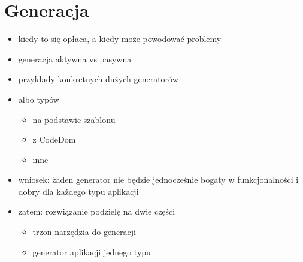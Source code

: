 \chapter{Generacja} \label{chap:generation}

\begin{itemize}
 \item kiedy to się opłaca, a kiedy może powodować problemy
 \item generacja aktywna vs pasywna
 \item przykłady konkretnych dużych generatorów
 \item albo typów
  \begin{itemize}
   \item na podstawie szablonu
   \item z CodeDom
   \item inne
  \end{itemize}
 \item wniosek: żaden generator nie będzie jednocześnie bogaty w funkcjonalności i dobry dla każdego typu aplikacji
 \item zatem: rozwiązanie podzielę na dwie części
  \begin{itemize}
   \item trzon narzędzia do generacji
   \item generator aplikacji jednego typu
  \end{itemize}
\end{itemize}
